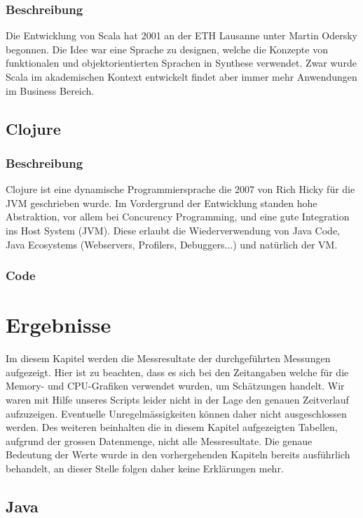 \documentclass{fancydocument}
\begin{document}
\subsubsection{Beschreibung}

Die Entwicklung von Scala hat 2001 an der ETH Lausanne unter Martin
Odersky begonnen. Die Idee war eine Sprache zu designen, welche die
Konzepte von funktionalen und objektorientierten Sprachen in Synthese
verwendet. Zwar wurde Scala im akademischen Kontext entwickelt findet
aber immer mehr Anwendungen im Business Bereich.

\subsection{Clojure}
\subsubsection{Beschreibung}

Clojure ist eine dynamische Programmiersprache die 2007 von Rich Hicky
für die JVM geschrieben wurde. Im Vordergrund der Entwicklung standen
hohe Abstraktion, vor allem bei Concurency Programming, und eine gute
Integration ins Host System (JVM). Diese erlaubt die Wiederverwendung von
Java Code, Java Ecosystems (Webservers, Profilers, Debuggers...) und natürlich der VM.

\subsubsection{Code}

\section{Ergebnisse}
Im diesem Kapitel werden die Messresultate der durchgeführten Messungen aufgezeigt. Hier ist zu beachten, dass es sich bei den Zeitangaben welche für die Memory- und CPU-Grafiken verwendet wurden, um Schätzungen handelt. Wir waren mit Hilfe unseres Scripts leider nicht in der Lage den genauen Zeitverlauf aufzuzeigen. Eventuelle Unregelmässigkeiten können daher nicht ausgeschlossen werden. Des weiteren beinhalten die in diesem Kapitel aufgezeigten Tabellen, aufgrund der grossen Datenmenge, nicht alle Messresultate. Die genaue Bedeutung der Werte wurde in den vorhergehenden Kapiteln bereits ausführlich behandelt, an dieser Stelle folgen daher keine Erklärungen mehr.

\subsection{Java}
\end{document}
